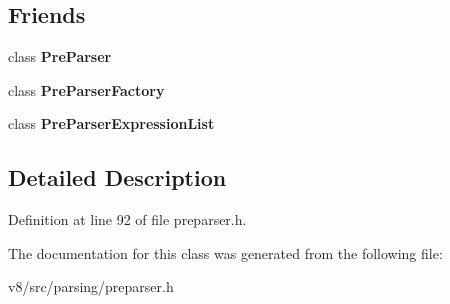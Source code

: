 \subsection*{Friends}
\begin{DoxyCompactItemize}
\item 
\mbox{\label{classv8_1_1internal_1_1PreParserExpression_aa52dc67118bf11b5e290e7675de340f2}} 
class {\bfseries Pre\+Parser}
\item 
\mbox{\label{classv8_1_1internal_1_1PreParserExpression_a352c2e06be1f10680f445e4e33e04c1c}} 
class {\bfseries Pre\+Parser\+Factory}
\item 
\mbox{\label{classv8_1_1internal_1_1PreParserExpression_a76eaf11793f6e253de4d1a33a05c39fd}} 
class {\bfseries Pre\+Parser\+Expression\+List}
\end{DoxyCompactItemize}


\subsection{Detailed Description}


Definition at line 92 of file preparser.\+h.



The documentation for this class was generated from the following file\+:\begin{DoxyCompactItemize}
\item 
v8/src/parsing/preparser.\+h\end{DoxyCompactItemize}
